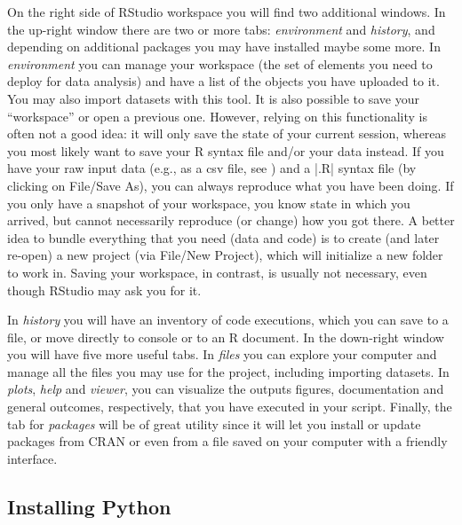 On the right side of RStudio workspace you will find two additional
windows. In the up-right window there are two or more tabs:
\emph{environment} and \emph{history}, and depending on additional
packages you may have installed maybe some more.  In
\emph{environment} you can manage your workspace (the set of elements
you need to deploy for data analysis) and have a list of the objects
you have uploaded to it. You may also import datasets with this tool.
It is also possible to save your ``workspace'' or open a previous one.
However, relying on this functionality is often not a good idea: it
will only save the state of your current session, whereas you most
likely want to save your R syntax file and/or your data instead.
If you have your raw input data (e.g., as a csv file, see )
and a |.R| syntax file (by clicking on File/Save As), you can always
reproduce what you have been doing. If you only have a snapshot of
your workspace, you know state in which you arrived, but cannot
necessarily reproduce (or change) how you got there. A better idea
to bundle everything that you need (data and code) is to create (and
later re-open) a new project (via File/New Project), which will
initialize a new folder to work in. Saving your workspace, in contrast,
is usually not necessary, even though RStudio may ask you for it.

In \emph{history} you will
have an inventory of code executions, which you can save to a file, or
move directly to console or to an R document. In the down-right window
you will have five more useful tabs. In \emph{files} you can explore
your computer and manage all the files you may use for the project,
including importing datasets. In \emph{plots}, \emph{help} and
\emph{viewer}, you can visualize the outputs figures, documentation
and general outcomes, respectively, that you have executed in your
script. Finally, the tab for \emph{packages} will be of great
utility since it will let you install or update packages from CRAN or
even from a file saved on your computer with a friendly interface.


\subsection{Installing Python}

